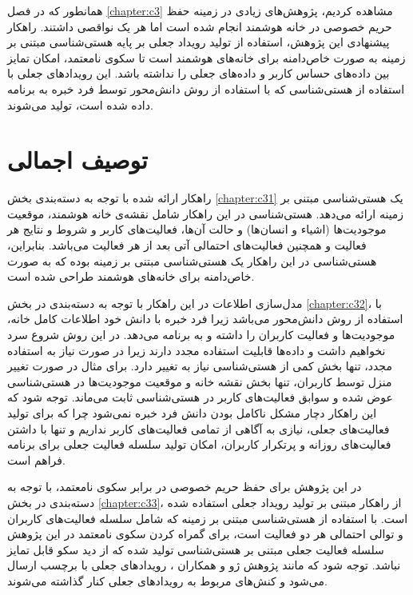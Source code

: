 
همانطور که در فصل \ref{chapter:c3} مشاهده کردیم، پژوهش‌های زیادی در زمینه حفظ حریم خصوصی در خانه هوشمند انجام شده است اما هر یک نواقصی داشتند. راهکار پیشنهادی این پژوهش، استفاده از تولید رویداد جعلی بر پایه هستی‌شناسی مبتنی بر زمینه به صورت خاص‌دامنه برای خانه‌های هوشمند است تا سکوی نامعتمد، امکان تمایز بین داده‌های حساس کاربر و داده‌های جعلی را نداشته باشد. این رویدادهای جعلی با استفاده از هستی‌شناسی که با استفاده از روش دانش‌محور توسط فرد خبره به برنامه داده شده است، تولید می‌شوند.

\section{توصیف اجمالی}

راهکار ارائه شده با توجه به دسته‌بندی بخش \ref{chapter:c31} یک هستی‌شناسی مبتنی بر زمینه ارائه می‌دهد. هستی‌شناسی در این راهکار شامل نقشه‌ی خانه هوشمند، موقعیت موجودیت‌ها (اشیاء و انسان‌ها) و حالت آن‌ها، فعالیت‌های کاربر و شروط و نتایج هر فعالیت و همچنین فعالیت‌های احتمالی آتی بعد از هر فعالیت می‌باشد. بنابراین، هستی‌شناسی در این راهکار یک هستی‌شناسی مبتنی بر زمینه بوده که به صورت خاص‌دامنه برای خانه‌های هوشمند طراحی شده است.

مدل‌سازی اطلاعات در این راهکار با توجه به دسته‌بندی در بخش \ref{chapter:c32}، با استفاده از روش دانش‌محور می‌باشد زیرا فرد خبره با دانش خود اطلاعات کامل خانه، موجودیت‌ها و فعالیت کاربران را داشته و به برنامه می‌دهد. در این روش شروع سرد نخواهیم داشت و داده‌ها قابلیت استفاده مجدد دارند زیرا در صورت نیاز به استفاده مجدد، تنها بخش کمی از هستی‌شناسی نیاز به تغییر دارد. برای مثال در صورت تغییر منزل توسط کاربران، تنها بخش نقشه خانه و موقعیت موجودیت‌ها در هستی‌شناسی عوض شده و سوابق فعالیت‌های کاربر در هستی‌شناسی ثابت می‌ماند. توجه شود که این راهکار دچار مشکل ناکامل بودن دانش فرد خبره نمی‌شود چرا که برای تولید فعالیت‌های جعلی، نیازی به آگاهی از تمامی فعالیت‌های کاربر نداریم و تنها با داشتن فعالیت‌های روزانه و پرتکرار کاربران، امکان تولید سلسله فعالیت جعلی برای برنامه فراهم است.

در این پژوهش برای حفظ حریم خصوصی در برابر سکوی نامعتمد، با توجه به دسته‌بندی در بخش \ref{chapter:c33}، از راهکار مبتنی بر تولید رویداد جعلی استفاده شده است. با استفاده از هستی‌شناسی مبتنی بر زمینه که شامل سلسله فعالیت‌های کاربران و توالی احتمالی هر دو فعالیت است، برای گمراه کردن سکوی نامعتمد در این پژوهش سلسله فعالیت جعلی مبتنی بر هستی‌شناسی تولید شده که از دید سکو قابل تمایز نباشد. توجه شود که مانند پژوهش ژو و همکاران \cite{x3311}، رویدادهای جعلی با برچسب ارسال می‌شود و کنش‌های مربوط به رویدادهای جعلی کنار گذاشته می‌شوند.

